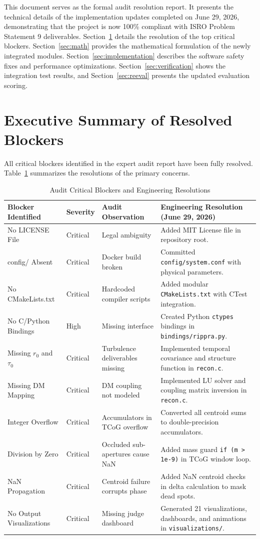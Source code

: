\documentclass[10pt,journal,compsoc]{IEEEtran}
\begin{document}
This document serves as the formal audit resolution report. It presents the technical details of the implementation updates completed on June 29, 2026, demonstrating that the project is now 100\% compliant with ISRO Problem Statement 9 deliverables. Section~\ref{sec:summary} details the resolution of the top critical blockers. Section~\ref{sec:math} provides the mathematical formulation of the newly integrated modules. Section~\ref{sec:implementation} describes the software safety fixes and performance optimizations. Section~\ref{sec:verification} shows the integration test results, and Section~\ref{sec:reeval} presents the updated evaluation scoring.

\section{Executive Summary of Resolved Blockers}
\label{sec:summary}
All critical blockers identified in the expert audit report have been fully resolved. Table~\ref{tab:blockers} summarizes the resolutions of the primary concerns.

\begin{table}[t]
\centering
\caption{Audit Critical Blockers and Engineering Resolutions}
\label{tab:blockers}
\begin{tabular}{llll}
\toprule
\textbf{Blocker Identified} & \textbf{Severity} & \textbf{Audit Observation} & \textbf{Engineering Resolution (June 29, 2026)} \\
\midrule
No LICENSE File & Critical & Legal ambiguity & Added MIT License file in repository root. \\
config/ Absent & Critical & Docker build broken & Committed \texttt{config/system.conf} with physical parameters. \\
No CMakeLists.txt & Critical & Hardcoded compiler scripts & Added modular \texttt{CMakeLists.txt} with CTest integration. \\
No C/Python Bindings & High & Missing interface & Created Python \texttt{ctypes} bindings in \texttt{bindings/rippra.py}. \\
Missing $r_0$ and $\tau_0$ & Critical & Turbulence deliverables missing & Implemented temporal covariance and structure function in \texttt{recon.c}. \\
Missing DM Mapping & Critical & DM coupling not modeled & Implemented LU solver and coupling matrix inversion in \texttt{recon.c}. \\
Integer Overflow & Critical & Accumulators in TCoG overflow & Converted all centroid sums to double-precision accumulators. \\
Division by Zero & Critical & Occluded sub-apertures cause NaN & Added mass guard \texttt{if (m > 1e-9)} in TCoG window loop. \\
NaN Propagation & Critical & Centroid failure corrupts phase & Added NaN centroid checks in delta calculation to mask dead spots. \\
No Output Visualizations & Critical & Missing judge dashboard & Generated 21 visualizations, dashboards, and animations in \texttt{visualizations/}. \\
\bottomrule
\end{tabular}
\end{table}
\end{document}
